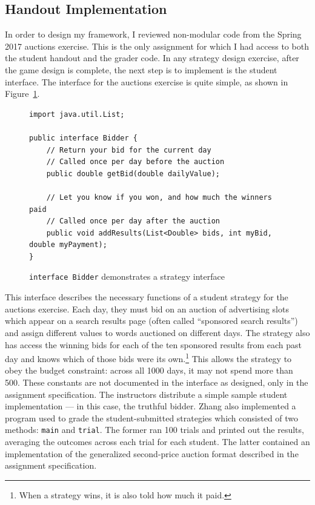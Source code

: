 \documentclass[pageno]{jpaper}
\begin{document}
\subsection*{Handout Implementation}
In order to design my framework, I reviewed non-modular code from the Spring 2017 auctions exercise.
This is the only assignment for which I had access to both the student handout and the grader code.
In any strategy design exercise, after the game design is complete, the next step is to implement is the student interface.
The interface for the auctions exercise is quite simple, as shown in Figure~\ref{minted:Bidder}.
\begin{figure}[hbt]
\begin{verbatim}
import java.util.List;

public interface Bidder {
    // Return your bid for the current day
    // Called once per day before the auction
    public double getBid(double dailyValue);

    // Let you know if you won, and how much the winners paid
    // Called once per day after the auction
    public void addResults(List<Double> bids, int myBid, double myPayment);
}
\end{verbatim}
  \caption{\texttt{interface Bidder} demonstrates a strategy interface}\label{minted:Bidder}
\end{figure}

This interface describes the necessary functions of a student strategy for the auctions exercise.
Each day, they must bid on an auction of advertising slots which appear on a search results page (often called ``sponsored search results'') and assign different values to words auctioned on different days.
The strategy also has access the winning bids for each of the ten sponsored results from each past day and knows which of those bids were its own.\footnote{When a strategy wins, it is also told how much it paid.}
This allows the strategy to obey the budget constraint: across all 1000 days, it may not spend more than 500.
These constants are not documented in the interface as designed, only in the assignment specification.
The instructors distribute a simple sample student implementation --- in this case, the truthful bidder.
Zhang also implemented a program used to grade the student-submitted strategies which consisted of two methods: \texttt{main} and \texttt{trial}.
The former ran 100 trials and printed out the results, averaging the outcomes across each trial for each student.
The latter contained an implementation of the generalized second-price auction format described in the assignment specification.
\end{document}
